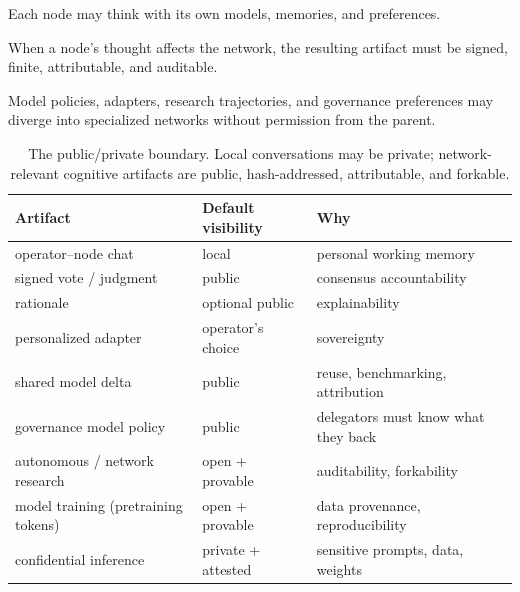 \documentclass[11pt]{article}
\begin{document}
\begin{description}[leftmargin=1.2em,style=nextline]
\item[Cognitive sovereignty.] Each node may think with its own models, memories, and preferences.
\item[Cognitive accountability.] When a node's thought affects the network, the resulting artifact must be signed, finite, attributable, and auditable.
\item[Cognitive forkability.] Model policies, adapters, research trajectories, and governance preferences may diverge into specialized networks without permission from the parent.
\end{description}

\begin{table}[h]
\centering\small
\begin{tabular}{@{}p{4.6cm}p{3.2cm}p{6.0cm}@{}}
\toprule
Artifact & Default visibility & Why \\
\midrule
operator--node chat & local & personal working memory \\
signed vote / judgment & public & consensus accountability \\
rationale & optional public & explainability \\
personalized adapter & operator's choice & sovereignty \\
shared model delta & public & reuse, benchmarking, attribution \\
governance model policy & public & delegators must know what they back \\
autonomous / network research & open + provable & auditability, forkability \\
model training (pretraining tokens) & open + provable & data provenance, reproducibility \\
confidential inference & private + attested & sensitive prompts, data, weights \\
\bottomrule
\end{tabular}
\caption{The public/private boundary. Local conversations may be private; network-relevant cognitive artifacts are public, hash-addressed, attributable, and forkable.}
\label{tab:visibility}
\end{table}
\end{document}

